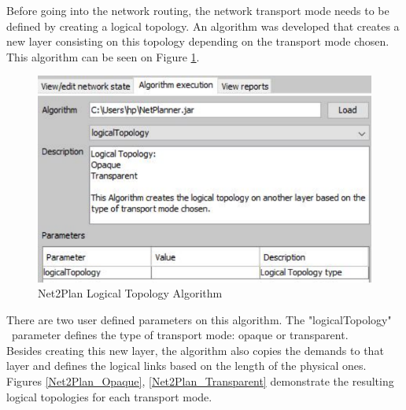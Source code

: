 	Before going into the network routing, the network transport mode needs to be defined by creating a logical topology. An algorithm was developed that creates a new layer consisting on this topology depending on the transport mode chosen. This algorithm can be seen on Figure \ref{Logical_Topology_Algorithm}.\\

	\begin{figure}[H]
		\centering
		\includegraphics[width = 12cm]{Logical_Topology_Algorithm.pdf}
		\caption{Net2Plan Logical Topology Algorithm}
		\label{Logical_Topology_Algorithm}
	\end{figure}


	There are two user defined parameters on this algorithm. The "logicalTopology" \ parameter defines the type of transport mode: opaque or transparent.\\
	
	
	Besides creating this new layer, the algorithm also copies the demands to that layer and defines the logical links based on the length of the physical ones.
	Figures \ref{Net2Plan_Opaque}, \ref{Net2Plan_Transparent}  demonstrate the resulting logical topologies for each transport mode.
	
